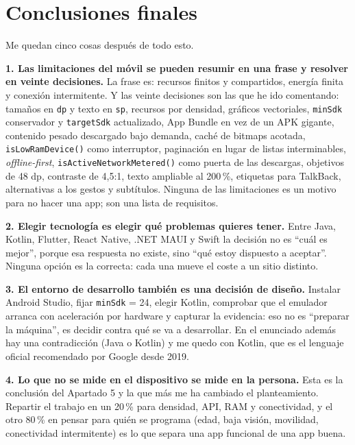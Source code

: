 \documentclass[11pt,a4paper]{article}
\newcommand{\code}[1]{\texttt{\color{ink}#1}}
\begin{document}
	\newpage
	\section*{Conclusiones finales}
	
	Me quedan cinco cosas después de todo esto.
	
	\textbf{1. Las limitaciones del móvil se pueden resumir en una frase y resolver en veinte decisiones.} La frase es: recursos finitos y compartidos, energía finita y conexión intermitente. Y las veinte decisiones son las que he ido comentando: tamaños en \code{dp} y texto en \code{sp}, recursos por densidad, gráficos vectoriales, \code{minSdk} conservador y \code{targetSdk} actualizado, App Bundle en vez de un APK gigante, contenido pesado descargado bajo demanda, caché de bitmaps acotada, \code{isLowRamDevice()} como interruptor, paginación en lugar de listas interminables, \emph{offline-first}, \code{isActiveNetworkMetered()} como puerta de las descargas, objetivos de 48 dp, contraste de 4,5:1, texto ampliable al 200\,\%, etiquetas para TalkBack, alternativas a los gestos y subtítulos. Ninguna de las limitaciones es un motivo para no hacer una app; son una lista de requisitos.
	
	\textbf{2. Elegir tecnología es elegir qué problemas quieres tener.} Entre Java, Kotlin, Flutter, React Native, .NET MAUI y Swift la decisión no es \enquote{cuál es mejor}, porque esa respuesta no existe, sino \enquote{qué estoy dispuesto a aceptar}. Ninguna opción es la correcta: cada una mueve el coste a un sitio distinto.
	
	\textbf{3. El entorno de desarrollo también es una decisión de diseño.} Instalar Android Studio, fijar \code{minSdk} = 24, elegir Kotlin, comprobar que el emulador arranca con aceleración por hardware y capturar la evidencia: eso no es \enquote{preparar la máquina}, es decidir contra qué se va a desarrollar. En el enunciado además hay una contradicción (Java o Kotlin) y me quedo con Kotlin, que es el lenguaje oficial recomendado por Google desde 2019.
	
	\textbf{4. Lo que no se mide en el dispositivo se mide en la persona.} Esta es la conclusión del Apartado 5 y la que más me ha cambiado el planteamiento. Repartir el trabajo en un 20\,\% para densidad, API, RAM y conectividad, y el otro 80\,\% en pensar para quién se programa (edad, baja visión, movilidad, conectividad intermitente) es lo que separa una app funcional de una app buena.
	
\end{document}
